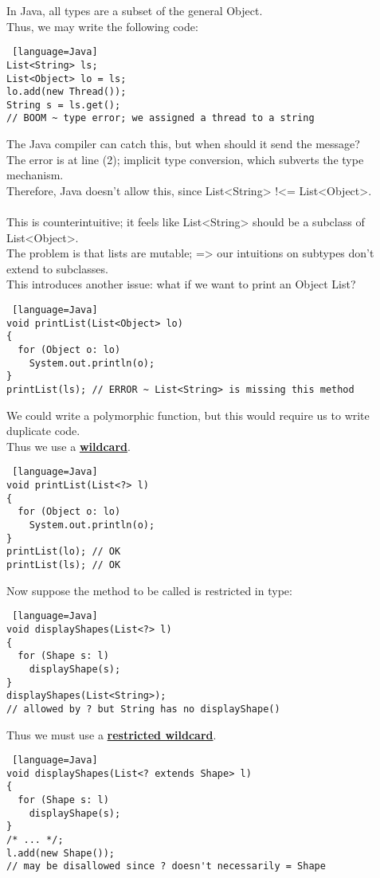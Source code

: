 \documentclass[../../lecture_notes.tex]{subfiles}
\begin{document}
\noindent In Java, all types are a subset of the general Object.\\
Thus, we may write the following code:
\begin{lstlisting} [language=Java]
List<String> ls;
List<Object> lo = ls;
lo.add(new Thread());
String s = ls.get(); 
// BOOM ~ type error; we assigned a thread to a string
\end{lstlisting}

\noindent The Java compiler can catch this, but when should it send the message?\\
\indent The error is at line (2); implicit type conversion, which subverts the type mechanism.\\
Therefore, Java doesn’t allow this, since List<String> !<= List<Object>.\\
\\
 This is counterintuitive; it feels like List<String> should be a subclass of List<Object>.\\
 The problem is that lists are mutable; => our intuitions on subtypes don’t extend to subclasses.\\

This introduces another issue: what if we want to print an Object List?
\begin{lstlisting} [language=Java]
void printList(List<Object> lo)
{
  for (Object o: lo)
    System.out.println(o);
}
printList(ls); // ERROR ~ List<String> is missing this method
\end{lstlisting} \medskip

\noindent We could write a polymorphic function, but this would require us to write duplicate code.\\
Thus we use a \textbf{\underline{wildcard}}.
\begin{lstlisting} [language=Java]
void printList(List<?> l)
{
  for (Object o: lo)
    System.out.println(o);
}
printList(lo); // OK
printList(ls); // OK
\end{lstlisting} \medskip

\noindent Now suppose the method to be called is restricted in type:
\begin{lstlisting} [language=Java]
void displayShapes(List<?> l)
{
  for (Shape s: l)
    displayShape(s);
}
displayShapes(List<String>);
// allowed by ? but String has no displayShape()
\end{lstlisting} \medskip

\noindent Thus we must use a \textbf{\underline{restricted wildcard}}.
\begin{lstlisting} [language=Java]
void displayShapes(List<? extends Shape> l)
{
  for (Shape s: l)
    displayShape(s);
}
/* ... */;
l.add(new Shape()); 
// may be disallowed since ? doesn't necessarily = Shape
\end{lstlisting} \medskip
\end{document}
